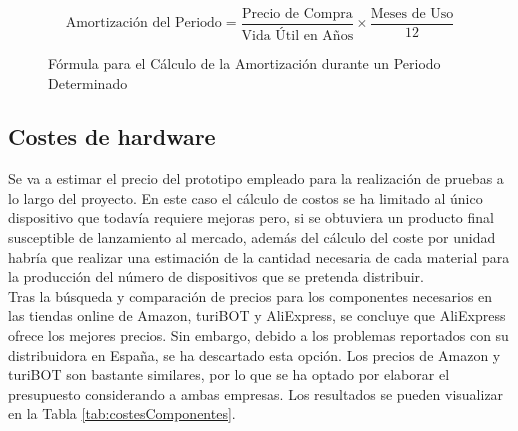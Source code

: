\begin{figure}[h]
    \centering
    \[
    \text{Amortización del Periodo} = \frac{\text{Precio de Compra}}{\text{Vida Útil en Años}} \times \frac{\text{Meses de Uso}}{12}
    \]
    \caption{Fórmula para el Cálculo de la Amortización durante un Periodo Determinado}
    \label{fig:amortizacion-portatil}
\end{figure}

\subsection{Costes de hardware}
Se va a estimar el precio del prototipo empleado para la realización de pruebas a lo largo del proyecto. En este caso el cálculo de costos se ha limitado al único dispositivo que todavía requiere mejoras pero, si se obtuviera un producto final susceptible de lanzamiento al mercado, además del cálculo del coste por unidad habría que realizar una estimación de la cantidad necesaria de cada material para la producción del número de dispositivos que se pretenda distribuir.\\
Tras la búsqueda y comparación de precios para los componentes necesarios en las tiendas online de Amazon, turiBOT y AliExpress, se concluye que AliExpress ofrece los mejores precios. Sin embargo, debido a los problemas reportados con su distribuidora en España, se ha descartado esta opción. Los precios de Amazon \cite{Amazones75:online} y turiBOT \cite{turi:online} son bastante similares, por lo que se ha optado por elaborar el presupuesto considerando a ambas empresas. Los resultados se pueden visualizar en la Tabla \ref{tab:costesComponentes}.

